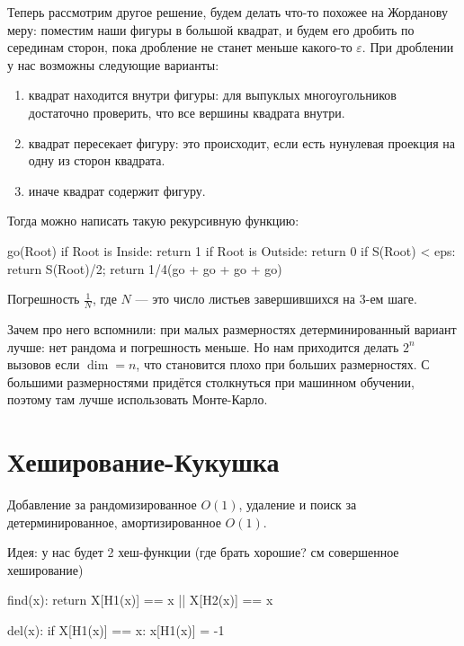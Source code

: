 Теперь рассмотрим другое решение, будем делать что-то похожее на Жорданову меру:
поместим наши фигуры в большой квадрат, и будем его дробить по серединам сторон,
пока дробление не станет меньше какого-то $\varepsilon$. При дроблении у нас возможны следующие варианты:

\begin{enumerate}
    \item квадрат находится внутри фигуры: для выпуклых многоугольников
        достаточно проверить, что все вершины квадрата внутри.
    \item квадрат пересекает фигуру: это происходит, если есть нунулевая проекция
        на одну из сторон квадрата.
    \item иначе квадрат содержит фигуру.
\end{enumerate}

Тогда можно написать такую рекурсивную функцию:

\begin{cppcode}
    go(Root)
    if Root is Inside:
        return 1
    if Root is Outside:
        return 0
    if S(Root) < eps:
        return S(Root)/2;
    return 1/4(go + go + go + go)
\end{cppcode}

Погрешность $\frac{1}{N}$, где $N$ --- это число листьев завершившихся на 3-ем шаге.

Зачем про него вспомнили: при малых размерностях детерминированный вариант лучше: нет рандома
и погрешность меньше. Но нам приходится делать $2^n$ вызовов если $\dim = n$, что становится
плохо при больших размерностях. С большими размерностями придётся столкнуться при машинном
обучении, поэтому там лучше использовать Монте-Карло.

\section{Хеширование-Кукушка}

Добавление за рандомизированное $O(1)$, удаление и поиск за детерминированное, амортизированное $O(1)$.

Идея: у нас будет 2 хеш-функции (где брать хорошие? см совершенное хеширование)

\begin{cppcode}
    find(x):
        return X[H1(x)] == x || X[H2(x)] == x
\end{cppcode}

\begin{cppcode}
    del(x):
        if X[H1(x)] == x:
            x[H1(x)] = -1
\end{cppcode}

